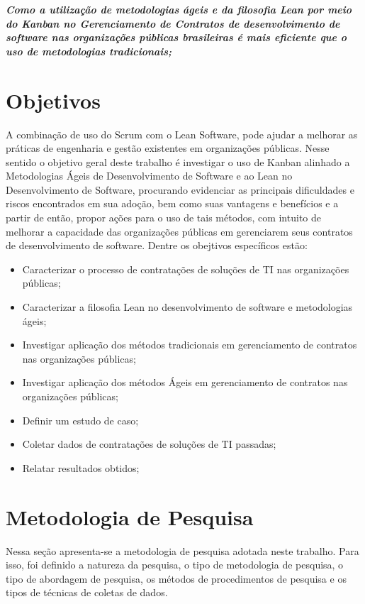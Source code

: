 \textit{\textbf {Como a utilização de metodologias ágeis e da filosofia Lean por meio do Kanban no Gerenciamento de Contratos de desenvolvimento de software nas organizações públicas brasileiras é mais eficiente que o uso de metodologias tradicionais;}}

\section[Objetivos]{Objetivos}

A combinação de uso do Scrum com o Lean Software, pode ajudar a melhorar as práticas de engenharia e gestão existentes em organizações públicas. Nesse sentido o objetivo geral deste trabalho é investigar o uso de Kanban alinhado a Metodologias Ágeis de Desenvolvimento de Software e ao Lean no Desenvolvimento de Software, procurando evidenciar as principais dificuldades e riscos encontrados em sua adoção, bem como suas vantagens e benefícios e a partir de então, propor ações para o uso de tais métodos, com intuito de melhorar a capacidade das organizações públicas em gerenciarem seus contratos de desenvolvimento de software. Dentre os obejtivos específicos estão:

\begin{itemize}
\item Caracterizar o processo de contratações de soluções de TI nas organizações públicas;
\item Caracterizar a filosofia Lean no desenvolvimento de software e metodologias ágeis;
\item Investigar aplicação dos métodos tradicionais em gerenciamento de contratos nas organizações públicas;
\item Investigar aplicação dos métodos Ágeis em gerenciamento de contratos nas organizações públicas;
\item Definir um estudo de caso;
\item Coletar dados de contratações de soluções de TI passadas;
\item Relatar resultados obtidos;
\end{itemize}

\section[Metodologia de Pesquisa]{Metodologia de Pesquisa}

Nessa seção apresenta-se a metodologia de pesquisa adotada neste trabalho.
Para isso, foi definido a natureza da pesquisa, o tipo de metodologia de pesquisa, o tipo de abordagem de pesquisa, os métodos de
procedimentos de pesquisa e os tipos de técnicas de coletas de dados.

